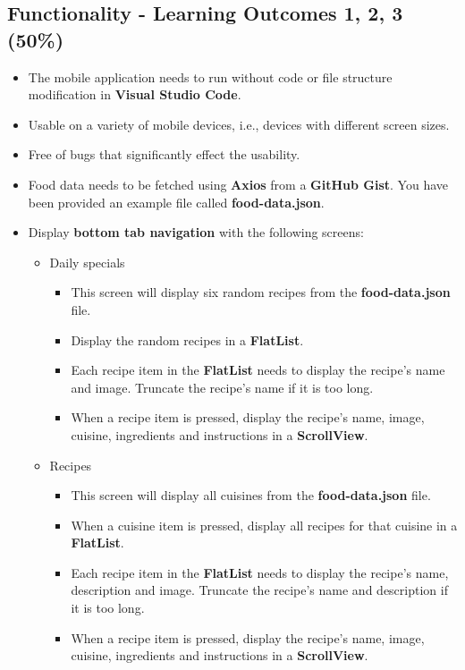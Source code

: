 \documentclass{article}
\begin{document}
\subsection*{Functionality - Learning Outcomes 1, 2, 3 (50\%)}
\begin{itemize}
  \item The mobile application needs to run without code or file structure modification in \textbf{Visual Studio Code}.
	\item Usable on a variety of mobile devices, i.e., devices with different screen sizes.
	\item Free of bugs that significantly effect the usability.
	\item Food data needs to be fetched using \textbf{Axios} from a \textbf{GitHub Gist}. You have been provided an example file called \textbf{food-data.json}.
	\item Display \textbf{bottom tab navigation} with the following screens:
	\begin{itemize}
    \item Daily specials
    \begin{itemize}
      \item This screen will display six random recipes from the \textbf{food-data.json} file. 
      \item Display the random recipes in a \textbf{FlatList}.
      \item Each recipe item in the \textbf{FlatList} needs to display the recipe's name and image. Truncate the recipe's name if it is too long.
      \item When a recipe item is pressed, display the recipe's name, image, cuisine, ingredients and instructions in a \textbf{ScrollView}. 
    \end{itemize}
    \item Recipes
    \begin{itemize}
      \item This screen will display all cuisines from the \textbf{food-data.json} file.
      \item When a cuisine item is pressed, display all recipes for that cuisine in a \textbf{FlatList}.
      \item Each recipe item in the \textbf{FlatList} needs to display the recipe's name, description and image. Truncate the recipe's name and description if it is too long.
      \item When a recipe item is pressed, display the recipe's name, image, cuisine, ingredients and instructions in a \textbf{ScrollView}. 

\end{itemize}
\end{itemize}
\end{itemize}
\end{document}
